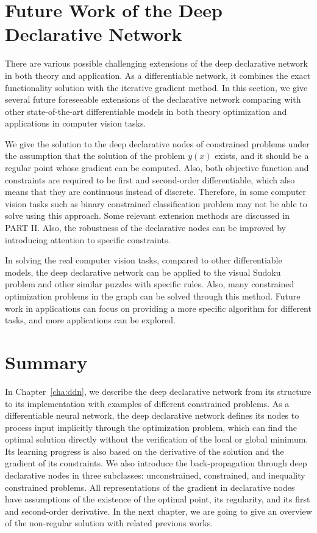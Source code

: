 \section{Future Work of the Deep Declarative Network}
There are various possible challenging extensions of the deep declarative network in both theory and application. As a differentiable network, it combines the exact functionality solution with the iterative gradient method. In this section, we give several future foreseeable extensions of the declarative network comparing with other state-of-the-art differentiable models in both theory optimization and applications in computer vision tasks. 
\par We give the solution to the deep declarative nodes of constrained problems under the assumption that the solution of the problem $y(x)$ exists, and it should be a regular point whose gradient can be computed. Also, both objective function and constraints are required to be first and second-order differentiable, which also means that they are continuous instead of discrete. Therefore, in some computer vision tasks such as binary constrained classification problem may not be able to solve using this approach. Some relevant extension methods are discussed in PART II. Also, the robustness of the declarative nodes can be improved by introducing attention to specific constraints. 
\par In solving the real computer vision tasks, compared to other differentiable models, the deep declarative network can be applied to the visual Sudoku problem and other similar puzzles with specific rules. Also, many constrained optimization problems in the graph can be solved through this method. Future work in applications can focus on providing a more specific algorithm for different tasks, and more applications can be explored. 

\section{Summary}
In Chapter~\ref{cha:ddn}, we describe the deep declarative network from its structure to its implementation with examples of different constrained problems. As a differentiable neural network, the deep declarative network defines its nodes to process input implicitly through the optimization problem, which can find the optimal solution directly without the verification of the local or global minimum. Its learning progress is also based on the derivative of the solution and the gradient of its constraints. We also introduce the back-propagation through deep declarative nodes in three subclasses: unconstrained, constrained, and inequality constrained problems. All representations of the gradient in declarative nodes have assumptions of the existence of the optimal point, its regularity, and its first and second-order derivative. In the next chapter, we are going to give an overview of the non-regular solution with related previous works. 